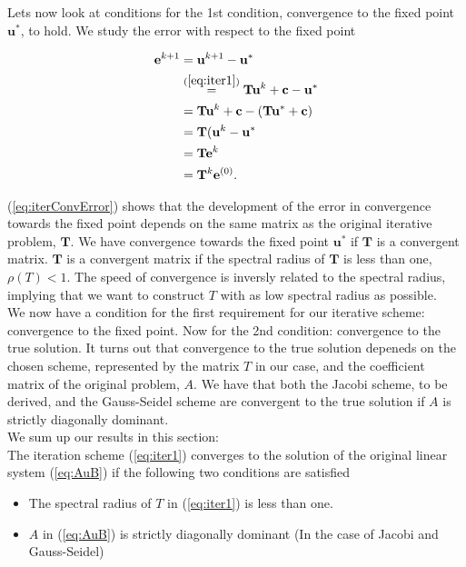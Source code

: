 \documentclass{article}
\begin{document}
Lets now look at conditions for the 1st condition, convergence to the fixed point $\mathbf{u^{*}}$, to hold. We study the error with respect to the fixed point

\begin{subequations}
	\begin{align}
		\mathbf{e}^{k+1} &= \mathbf{u}^{k+1} - \mathbf{u}^{*}\\
		&\stackrel{(\ref{eq:iter1})}{=}  \mathbf{T} \mathbf{u}^k + \mathbf{c} - \mathbf{u}^{*}\\
		&=\mathbf{T} \mathbf{u}^k + \mathbf{c} - (\mathbf{T} \mathbf{u}^{*} + \mathbf{c})\\
		&=\mathbf{T} (\mathbf{u}^k -\mathbf{u}^{*}\\
		&=\mathbf{T}\mathbf{e}^{k}\\
		&=\mathbf{T}^k\mathbf{e}^{(0)}.\label{eq:iterConvError}
	\end{align}
\end{subequations}

(\ref{eq:iterConvError}) shows that the development of the error in convergence towards the fixed point depends on the same matrix as the original iterative problem, $\mathbf{T}$. We have convergence towards the fixed point $\mathbf{u}^{*}$ if $\mathbf{T}$ is a convergent matrix. $\mathbf{T}$ is a convergent matrix if the spectral radius of $\mathbf{T}$ is less than one, $\rho(T) < 1$. The speed of convergence is inversly related to the spectral radius, implying that we want to construct $T$ with as low spectral radius as possible.  \\

We now have a condition for the first requirement for our iterative scheme: convergence to the fixed point. Now for the 2nd condition: convergence to the true solution. It turns out that convergence to the true solution depeneds on the chosen scheme, represented by the matrix $T$ in our case, and the coefficient matrix of the original problem, $A$. We have that both the Jacobi scheme, to be derived, and the Gauss-Seidel scheme are convergent to the true solution if $A$ is strictly diagonally dominant.\\

We sum up our results in this section:\\

The iteration scheme (\ref{eq:iter1}) converges to the solution of the original linear system (\ref{eq:AuB}) if the following two conditions are satisfied

\begin{itemize}
	\item{The spectral radius of $T$ in (\ref{eq:iter1}) is less than one.}
	
	\item{$A$ in (\ref{eq:AuB}) is strictly diagonally dominant (In the case of Jacobi and Gauss-Seidel)}
\end{itemize}
\end{document}
